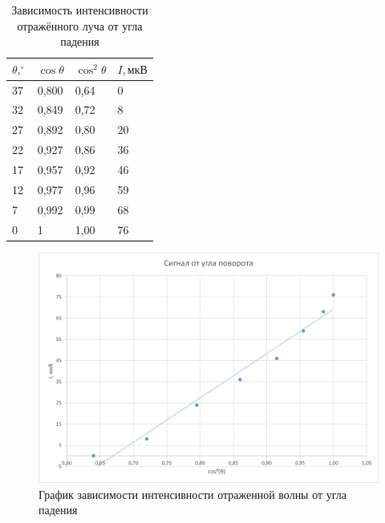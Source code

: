 \begin{table}[!ht]
    \centering
    \begin{tabular}{|l|l|l|l|}
    \hline
        $\theta, ^\circ$ & $\cos \theta$ & $\cos^2 \theta$ & $I, \text{мкВ}$ \\ \hline
        37 & 0,800 & 0,64 & 0 \\ \hline
        32 & 0,849 & 0,72 & 8 \\ \hline
        27 & 0,892 & 0,80 & 20 \\ \hline
        22 & 0,927 & 0,86 & 36 \\ \hline
        17 & 0,957 & 0,92 & 46 \\ \hline
        12 & 0,977 & 0,96 & 59 \\ \hline
        7 & 0,992 & 0,99 & 68 \\ \hline
        0 & 1 & 1,00 & 76 \\ \hline
    \end{tabular}
    \caption{Зависимость интенсивности отражённого луча от угла падения}
    \label{tab1}
\end{table}

\begin{figure}[H]
    \centering
    \includegraphics[scale=0.7]{pic/plot1.png}
    \caption{График зависимости интенсивности отраженной волны от угла падения}
    \label{graph1}
\end{figure}

